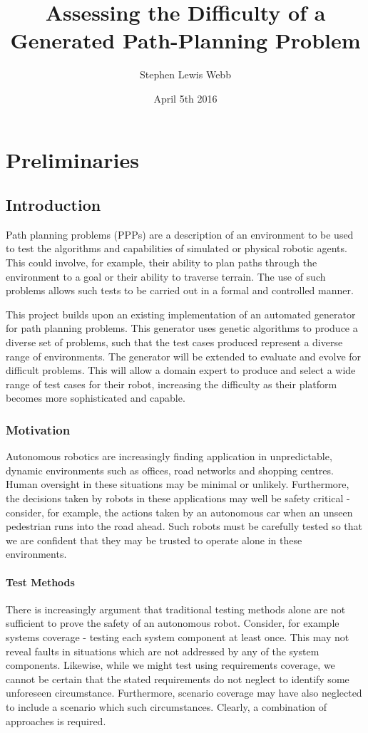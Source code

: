\documentclass[authoryearcitations]{UoYCSproject}
\author{Stephen Lewis Webb}
\title{Assessing the Difficulty of a Generated Path-Planning Problem}
\date{April 5th 2016}
\begin{document}
\maketitle
\listoffigures
\listoftables
\cleardoublepage

\part{Preliminaries}
\label{sec:start}
\thispagestyle{empty}\cleardoublepage
\chapter{Introduction}
\label{cha:Introduction}
Path planning problems (PPPs) are a description of an environment to be used to test the algorithms and capabilities of simulated or physical robotic agents. This could involve, for example, their ability to plan paths through the environment to a goal or their ability to traverse terrain. The use of such problems allows such tests to be carried out in a formal and controlled manner.

This project builds upon an existing implementation of an automated generator for path planning problems. This generator uses genetic algorithms to produce a diverse set of problems, such that the test cases produced represent a diverse range of environments. The generator will be extended to evaluate and evolve for difficult problems. This will allow a domain expert to produce and select a wide range of test cases for their robot, increasing the difficulty as their platform becomes more sophisticated and capable.

\section{Motivation}
\label{sec:Motivation}
Autonomous robotics are increasingly finding application in unpredictable, dynamic environments such as offices, road networks and shopping centres. Human oversight in these situations may be minimal or unlikely. Furthermore, the decisions taken by robots in these applications may well be safety critical - consider, for example, the actions taken by an autonomous car when an unseen pedestrian runs into the road ahead. Such robots must be carefully tested so that we are confident that they may be trusted to operate alone in these environments.
\subsection{Test Methods}
\label{sec:test_methods}
There is increasingly argument that traditional testing methods alone are not sufficient to prove the safety of an autonomous robot. Consider, for example systems coverage - testing each system component at least once. This may not reveal faults in situations which are not addressed by any of the system components. Likewise, while we might test using requirements coverage, we cannot be certain that the stated requirements do not neglect to identify some unforeseen circumstance. Furthermore, scenario coverage may have also neglected to include a scenario which such circumstances. Clearly, a combination of approaches is required.
\end{document}
